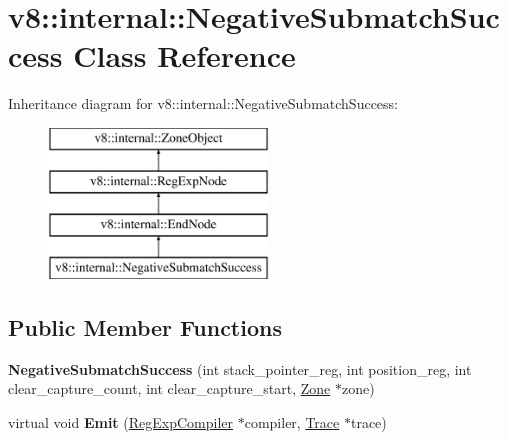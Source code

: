 \hypertarget{classv8_1_1internal_1_1_negative_submatch_success}{}\section{v8\+:\+:internal\+:\+:Negative\+Submatch\+Success Class Reference}
\label{classv8_1_1internal_1_1_negative_submatch_success}
Inheritance diagram for v8\+:\+:internal\+:\+:Negative\+Submatch\+Success\+:\begin{figure}[H]
\begin{center}
\leavevmode
\includegraphics[height=4.000000cm]{classv8_1_1internal_1_1_negative_submatch_success}
\end{center}
\end{figure}
\subsection*{Public Member Functions}
\begin{DoxyCompactItemize}
\item 
{\bfseries Negative\+Submatch\+Success} (int stack\+\_\+pointer\+\_\+reg, int position\+\_\+reg, int clear\+\_\+capture\+\_\+count, int clear\+\_\+capture\+\_\+start, \hyperlink{classv8_1_1internal_1_1_zone}{Zone} $\ast$zone)\hypertarget{classv8_1_1internal_1_1_negative_submatch_success_a792b6773216be761cb742b6243b7b6e8}{}\label{classv8_1_1internal_1_1_negative_submatch_success_a792b6773216be761cb742b6243b7b6e8}

\item 
virtual void {\bfseries Emit} (\hyperlink{classv8_1_1internal_1_1_reg_exp_compiler}{Reg\+Exp\+Compiler} $\ast$compiler, \hyperlink{classv8_1_1internal_1_1_trace}{Trace} $\ast$trace)\hypertarget{classv8_1_1internal_1_1_negative_submatch_success_a5d4dda4dc5337015377c20e40c8e8853}{}\label{classv8_1_1internal_1_1_negative_submatch_success_a5d4dda4dc5337015377c20e40c8e8853}

\end{DoxyCompactItemize}
